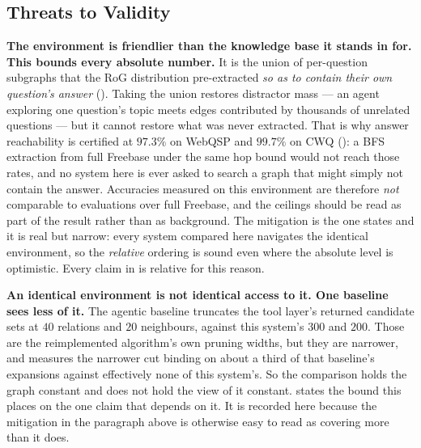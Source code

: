 \subsection{Threats to Validity}\label{sec:threats}

\textbf{The environment is friendlier than the knowledge base it stands in for.
This bounds every absolute number.} It is the union of per-question
subgraphs that the RoG distribution pre-extracted \emph{so as to contain their
own question's answer} (). Taking the union restores
distractor mass --- an agent exploring one question's topic meets edges
contributed by thousands of unrelated questions --- but it cannot restore what
was never extracted. That is why answer reachability is certified at $97.3\%$ on
WebQSP and $99.7\%$ on CWQ (): a BFS extraction from
full Freebase under the same hop bound would not reach those rates, and no
system here is ever asked to search a graph that might simply not contain the
answer. Accuracies measured on this environment are therefore \emph{not}
comparable to evaluations over full Freebase, and the ceilings should be read as
part of the result rather than as background. The mitigation is the one
 states and it is real but narrow: every system compared
here navigates the identical environment, so the \emph{relative} ordering is
sound even where the absolute level is optimistic. Every claim in
 is relative for this reason.

\textbf{An identical environment is not identical access to it. One baseline
sees less of it.} The agentic baseline truncates the tool layer's returned
candidate sets at $40$ relations and $20$ neighbours, against this system's
$300$ and $200$. Those are the reimplemented algorithm's own pruning widths, but
they are narrower, and  measures the narrower cut binding
on about a third of that baseline's expansions against effectively none of this
system's. So the comparison holds the graph constant and does not hold the view
of it constant.  states the bound this places on the one
claim that depends on it. It is recorded here because the mitigation in the
paragraph above is otherwise easy to read as covering more than it does.

